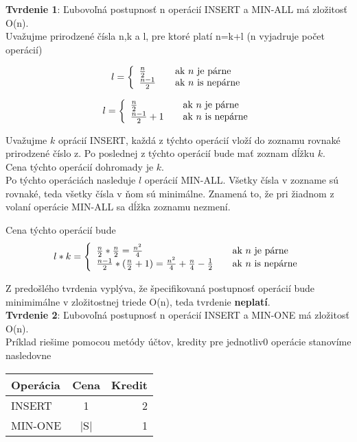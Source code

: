 \documentclass[paper=a4, fontsize=11pt]{scrartcl} %
\numberwithin{equation}{section} %
\numberwithin{figure}{section} %
\numberwithin{table}{section} %
\begin{document}
\textbf{Tvrdenie 1}: Ľubovoľná postupnosť n operácií INSERT  a MIN-ALL má zložitosť O(n). \\

Uvažujme prirodzené čísla n,k a l, pre ktoré platí n=k+l (n vyjadruje počet operácií)

\[ l = \left\{ 
  \begin{array}{l l}
    \frac{n}{2} & \quad \text{ak $n$ je párne}\\
    \frac{n-1}{2} & \quad \text{ak $n$ is nepárne}
  \end{array} \right.\]

\[ l = \left\{ 
  \begin{array}{l l}
    \frac{n}{2} & \quad \text{ak $n$ je párne}\\
    \frac{n-1}{2} + 1 & \quad \text{ak $n$ is nepárne}
  \end{array} \right.\]


Uvažujme $k$ oprácií INSERT, každá z týchto operácií vloží do zoznamu rovnaké prirodzené číslo z.
Po poslednej z týchto operácií bude mať zoznam dĺžku $k$. \\

Cena týchto operácií dohromady je $k$. \\

Po týchto operáciách nasleduje $l$ operácií MIN-ALL.
Všetky čísla v zozname sú rovnaké, teda všetky čísla v ňom sú minimálne.
Znamená to, že pri žiadnom z volaní operácie MIN-ALL sa dĺžka zoznamu nezmení.


Cena týchto operácií bude 
\[ l*k = \left\{ 
  \begin{array}{l l}
    \frac{n}{2}* \frac{n}{2} = \frac{n^2}{4} & \quad \text{ak $n$ je párne}\\
    \frac{n-1}{2}* (\frac{n}{2} + 1) = \frac{n^2}{4} + \frac{n}{4} - \frac{1}{2} & \quad \text{ak $n$ is nepárne}
  \end{array} \right.\]

Z predošlého tvrdenia vyplýva, že špecifikovaná postupnosť operácií bude minimimálne v zložitostnej triede O(n), teda tvrdenie \textbf{neplatí}. \\

\textbf{Tvrdenie 2}: Ľubovoľná postupnosť n operácií INSERT  a MIN-ONE má zložitosť O(n). \\
Príklad riešime pomocou metódy účtov, kredity pre jednotliv0 operácie stanovíme nasledovne \\

  \begin{tabular}{ | l | c | r | }
    \hline
    Operácia & Cena & Kredit \\	
    \hline
    INSERT & 1 & 2 \\ 
    MIN-ONE & |S| & 1 \\
    \hline
  \end{tabular}\\
\end{document}
